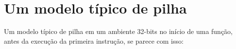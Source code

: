 \section{Um modelo típico de pilha}

Um modelo típico de pilha em um ambiente 32-bits no início de uma função,
antes da execução da primeira instrução, se parece com isso:



